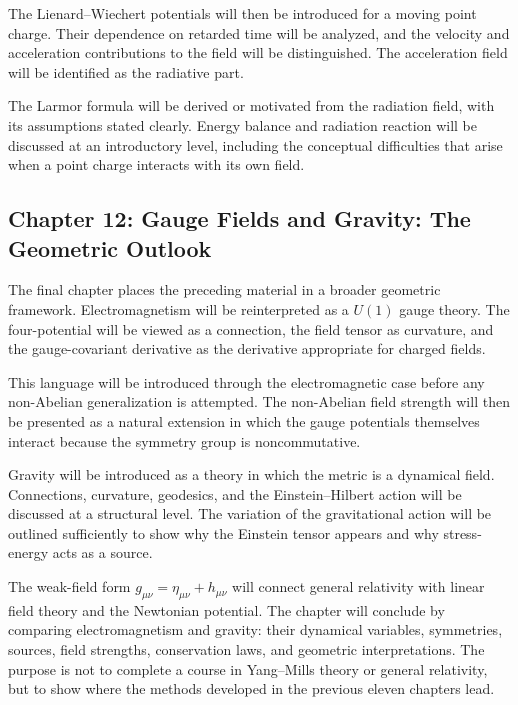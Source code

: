 The Lienard--Wiechert potentials will then be introduced for a moving point charge. Their dependence on retarded time will be analyzed, and the velocity and acceleration contributions to the field will be distinguished. The acceleration field will be identified as the radiative part.

The Larmor formula will be derived or motivated from the radiation field, with its assumptions stated clearly. Energy balance and radiation reaction will be discussed at an introductory level, including the conceptual difficulties that arise when a point charge interacts with its own field.

\subsection*{Chapter 12: Gauge Fields and Gravity: The Geometric Outlook}

The final chapter places the preceding material in a broader geometric framework. Electromagnetism will be reinterpreted as a \(U(1)\) gauge theory. The four-potential will be viewed as a connection, the field tensor as curvature, and the gauge-covariant derivative as the derivative appropriate for charged fields.

This language will be introduced through the electromagnetic case before any non-Abelian generalization is attempted. The non-Abelian field strength will then be presented as a natural extension in which the gauge potentials themselves interact because the symmetry group is noncommutative.

Gravity will be introduced as a theory in which the metric is a dynamical field. Connections, curvature, geodesics, and the Einstein--Hilbert action will be discussed at a structural level. The variation of the gravitational action will be outlined sufficiently to show why the Einstein tensor appears and why stress-energy acts as a source.

The weak-field form \(g_{\mu\nu}=\eta_{\mu\nu}+h_{\mu\nu}\) will connect general relativity with linear field theory and the Newtonian potential. The chapter will conclude by comparing electromagnetism and gravity: their dynamical variables, symmetries, sources, field strengths, conservation laws, and geometric interpretations. The purpose is not to complete a course in Yang--Mills theory or general relativity, but to show where the methods developed in the previous eleven chapters lead.
